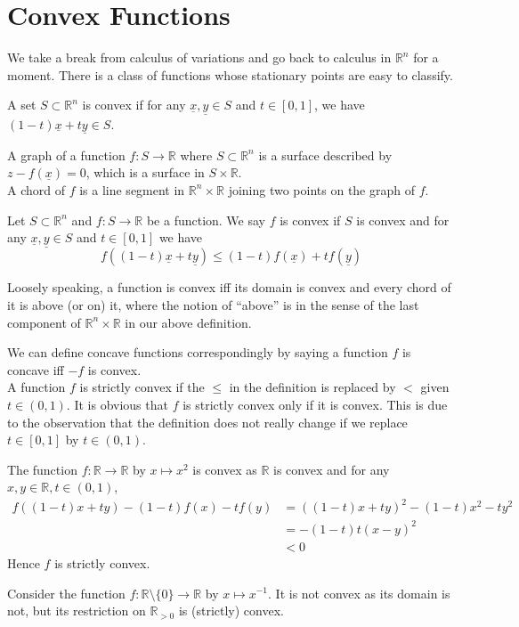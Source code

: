 \section{Convex Functions}
We take a break from calculus of variations and go back to calculus in $\mathbb R^n$ for a moment.
There is a class of functions whose stationary points are easy to classify.
\begin{definition}
    A set $S\subset\mathbb R^n$ is convex if for any $\underline{x},\underline{y}\in S$ and $t\in[0,1]$, we have $(1-t)\underline{x}+t\underline{y}\in S$.
\end{definition}
\begin{definition}
    A graph of a function $f:S\to\mathbb R$ where $S\subset\mathbb R^n$ is a surface described by $z-f(\underline{x})=0$, which is a surface in $S\times\mathbb R$.\\
    A chord of $f$ is a line segment in $\mathbb R^n\times\mathbb R$ joining two points on the graph of $f$.
\end{definition}
\begin{definition}
    Let $S\subset\mathbb R^n$ and $f:S\to\mathbb R$ be a function.
    We say $f$ is convex if $S$ is convex and for any $\underline{x},\underline{y}\in S$ and $t\in[0,1]$ we have
    $$f((1-t)\underline{x}+t\underline{y})\le (1-t)f(\underline{x})+tf(\underline{y})$$
\end{definition}
Loosely speaking, a function is convex iff its domain is convex and every chord of it is above (or on) it, where the notion of ``above'' is in the sense of the last component of $\mathbb R^n\times\mathbb R$ in our above definition.
\begin{remark}
    We can define concave functions correspondingly by saying a function $f$ is concave iff $-f$ is convex.\\
    A function $f$ is strictly convex if the $\le$ in the definition is replaced by $<$ given $t\in (0,1)$.
    It is obvious that $f$ is strictly convex only if it is convex.
    This is due to the observation that the definition does not really change if we replace $t\in[0,1]$ by $t\in(0,1)$.
\end{remark}
\begin{example}
    The function $f:\mathbb R\to\mathbb R$ by $x\mapsto x^2$ is convex as $\mathbb R$ is convex and for any $x,y\in\mathbb R,t\in (0,1)$,
    \begin{align*}
        f((1-t)x+ty)-(1-t)f(x)-tf(y)&=((1-t)x+ty)^2-(1-t)x^2-ty^2\\
        &=-(1-t)t(x-y)^2\\
        &<0
    \end{align*}
    Hence $f$ is strictly convex.
\end{example}
\begin{example}
    Consider the function $f:\mathbb R\setminus\{0\}\to\mathbb R$ by $x\mapsto x^{-1}$.
    It is not convex as its domain is not, but its restriction on $\mathbb R_{>0}$ is (strictly) convex.
\end{example}
